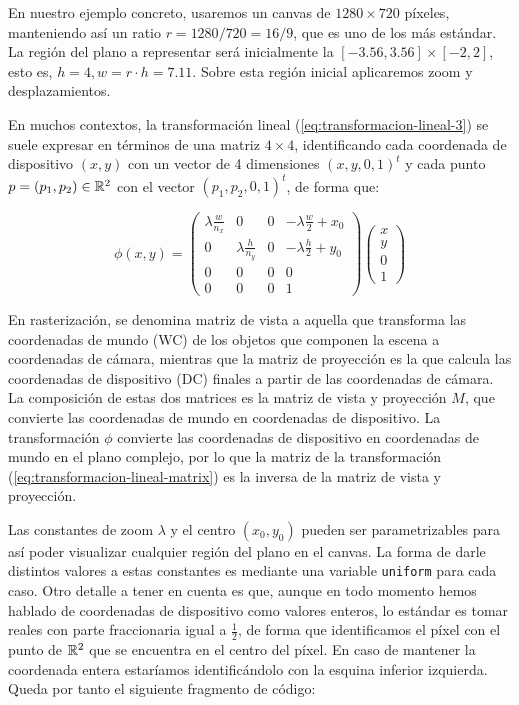 En nuestro ejemplo concreto, usaremos un canvas de $1280\times 720$ píxeles, manteniendo así un ratio $r=1280/720=16/9$, que es uno de los más estándar. La región del plano a representar será inicialmente la $[-3.56,3.56]\times[-2,2]$, esto es, $h=4, w=r\cdot h =7.11$. Sobre esta región inicial aplicaremos zoom y desplazamientos.

En muchos contextos, la transformación lineal (\ref{eq:transformacion-lineal-3}) se suele expresar en términos de una matriz $4\times 4$, identificando cada coordenada de dispositivo $(x,y)$ con un vector de 4 dimensiones $(x,y,0,1)^t$ y cada punto $p=(p_1,p_2)\in\mathbb{R}^2$ con el vector $(p_1, p_2, 0 ,1)^t$, de forma que:

\begin{equation}
    \label{eq:transformacion-lineal-matrix}
    \phi(x,y)=\left(\begin{array}{ccc|c}
        \lambda\frac{w}{n_x} & 0 & 0 & -\lambda\frac{w}{2}+x_0 \\

        0 & \lambda\frac{h}{n_y} & 0 & -\lambda\frac{h}{2}+y_0 \\
        0 & 0 & 0 & 0 \\ \hline
        0 & 0 & 0 & 1
    \end{array}\right)\left(
    \begin{array}{c}
        x \\ y \\ 0 \\ \hline 1
    \end{array}\right)
\end{equation}

En rasterización, se denomina matriz de vista a aquella que transforma las coordenadas de mundo (WC) de los objetos que componen la escena a coordenadas de cámara, mientras que la matriz de proyección es la que calcula las coordenadas de dispositivo (DC) finales a partir de las coordenadas de cámara. La composición de estas dos matrices es la matriz de vista y proyección $M$, que convierte las coordenadas de mundo en coordenadas de dispositivo. La transformación $\phi$ convierte las coordenadas de dispositivo en coordenadas de mundo en el plano complejo, por lo que la matriz de la transformación (\ref{eq:transformacion-lineal-matrix}) es la inversa de la matriz de vista y proyección.


Las constantes de zoom $\lambda$ y el centro $(x_0,y_0)$ pueden ser parametrizables para así poder visualizar cualquier región del plano en el canvas. La forma de darle distintos valores a estas constantes es mediante una variable \verb|uniform| para cada caso. Otro detalle a tener en cuenta es que, aunque en todo momento hemos hablado de coordenadas de dispositivo como valores enteros, lo estándar es tomar reales con parte fraccionaria igual a $\frac{1}{2}$, de forma que identificamos el píxel con el punto de $\mathbb{R}^2$ que se encuentra en el centro del píxel. En caso de mantener la coordenada entera estaríamos identificándolo con la esquina inferior izquierda. Queda por tanto el siguiente fragmento de código:

